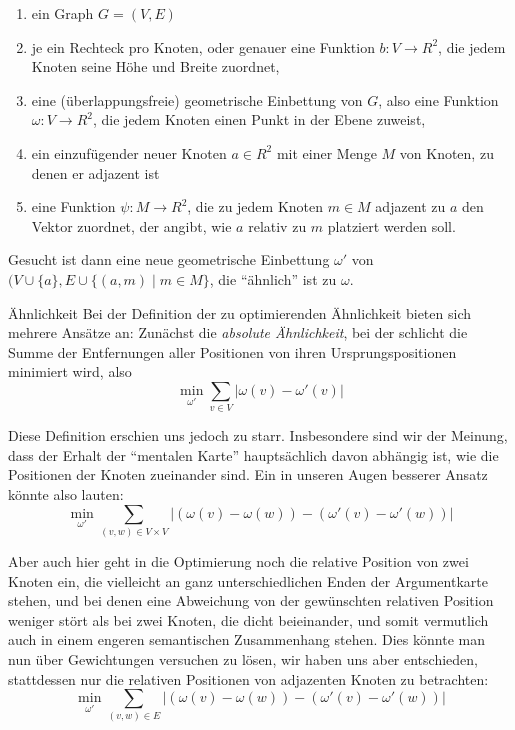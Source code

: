\begin{enumerate}
  \item ein Graph $G = (V, E)$
  \item je ein Rechteck pro Knoten, oder genauer eine Funktion $b: V \rightarrow R^2$, die jedem Knoten seine Höhe und Breite zuordnet,
  \item eine (überlappungsfreie) geometrische Einbettung von $G$, also eine Funktion $\omega: V \rightarrow R^2$, die jedem Knoten einen Punkt in der Ebene zuweist,
  \item ein einzufügender neuer Knoten $a \in R^2$ mit einer Menge $M$ von Knoten, zu denen er adjazent ist
  \item eine Funktion $\psi: M \rightarrow R^2$, die zu jedem Knoten $m \in M$ adjazent zu $a$ den Vektor zuordnet, der angibt, wie $a$ relativ zu $m$ platziert werden soll.
\end{enumerate}

Gesucht ist dann eine neue geometrische Einbettung $\omega'$ von $(V \cup \{a\}, E \cup \{(a,m) \mid m \in M\}$, die "`ähnlich"' ist zu $\omega$.

\begin{paragraph}{Ähnlichkeit}
  Bei der Definition der zu optimierenden Ähnlichkeit bieten sich mehrere Ansätze an: Zunächst die \textit{absolute Ähnlichkeit}, bei der schlicht die Summe der Entfernungen aller Positionen von ihren Ursprungspositionen minimiert wird, also
  \begin{equation}
    \min_{\omega'} \sum \limits_{v \in V} {|\omega(v) - \omega'(v)|}
  \end{equation}

  Diese Definition erschien uns jedoch zu starr. Insbesondere sind wir der Meinung, dass der Erhalt der "`mentalen Karte"' hauptsächlich davon abhängig ist, wie die Positionen der Knoten zueinander sind. Ein in unseren Augen besserer Ansatz könnte also lauten:
  \begin{equation}
    \min_{\omega'} \sum \limits_{(v,w) \in V \times V} {|(\omega(v) - \omega(w)) - (\omega'(v) - \omega'(w))|}
  \end{equation}

  Aber auch hier geht in die Optimierung noch die relative Position von zwei Knoten ein, die vielleicht an ganz unterschiedlichen Enden der Argumentkarte stehen, und bei denen eine Abweichung von der gewünschten relativen Position weniger stört als bei zwei Knoten, die dicht beieinander, und somit vermutlich auch in einem engeren semantischen Zusammenhang stehen. Dies könnte man nun über Gewichtungen versuchen zu lösen, wir haben uns aber entschieden, stattdessen nur die relativen Positionen von adjazenten Knoten zu betrachten:
  \begin{equation}
    \label{eqn:opt:basic}
    \min_{\omega'} \sum \limits_{(v,w) \in E} {|(\omega(v) - \omega(w)) - (\omega'(v) - \omega'(w))|}
  \end{equation}
\end{paragraph}

